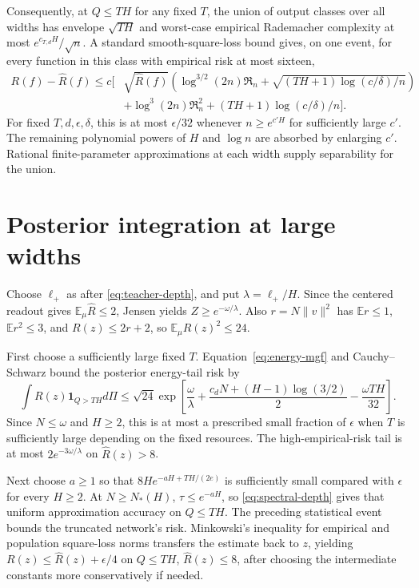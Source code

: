 \documentclass[11pt]{article}
\newcommand{\E}{\mathbb E}\newcommand{\R}{\mathbb R}\newcommand{\KL}{\operatorname{KL}}\newcommand{\op}{\mathrm{op}}
\begin{document}
Consequently, at $Q\le TH$ for any fixed $T$, the union of output classes over all widths has envelope $\sqrt{TH}$ and worst-case empirical Rademacher complexity at most $e^{c_{T,d}H}/\sqrt n$. A standard smooth-square-loss bound \cite{sst} gives, on one event, for every function in this class with empirical risk at most sixteen,
\[
 \begin{aligned}
 R(f)-\widehat R(f)\le c\bigg[&
 \sqrt{\widehat R(f)}\left(\log^{3/2}(2n)\mathfrak R_n+
       \sqrt{(TH+1)\log(c/\delta)/n}\right)\\
 &+\log^3(2n)\mathfrak R_n^2+(TH+1)\log(c/\delta)/n\bigg].
 \end{aligned}
\]
For fixed $T,d,\epsilon,\delta$, this is at most $\epsilon/32$ whenever $n\ge e^{c'H}$ for sufficiently large $c'$. The remaining polynomial powers of $H$ and $\log n$ are absorbed by enlarging $c'$. Rational finite-parameter approximations at each width supply separability for the union.

\section{Posterior integration at large widths}
Choose $\ell_+$ as after \eqref{eq:teacher-depth}, and put $\lambda=\ell_+/H$. Since the centered readout gives $\E_\mu\widehat R\le2$, Jensen yields $Z\ge e^{-\omega/\lambda}$. Also $r=N\|v\|^2$ has $\E r\le1$, $\E r^2\le3$, and $R(z)\le2r+2$, so $\E_\mu R(z)^2\le24$.

First choose a sufficiently large fixed $T$. Equation~\eqref{eq:energy-mgf} and Cauchy--Schwarz bound the posterior energy-tail risk by
\[
 \int R(z)\mathbf1_{Q>TH}d\Pi
 \le\sqrt{24}\exp\left[\frac\omega\lambda+
       \frac{c_dN+(H-1)\log(3/2)}2-\frac{\omega TH}{32}\right].
\]
Since $N\le\omega$ and $H\ge2$, this is at most a prescribed small fraction of $\epsilon$ when $T$ is sufficiently large depending on the fixed resources. The high-empirical-risk tail is at most
$2e^{-3\omega/\lambda}$ on $\widehat R(z)>8$.

Next choose $a\ge1$ so that $8H e^{-aH+TH/(2e)}$ is sufficiently small compared with $\epsilon$ for every $H\ge2$. At $N\ge N_*(H)$, $\tau\le e^{-aH}$, so \eqref{eq:spectral-depth} gives that uniform approximation accuracy on $Q\le TH$. The preceding statistical event bounds the truncated network's risk. Minkowski's inequality for empirical and population square-loss norms transfers the estimate back to $z$, yielding
$R(z)\le\widehat R(z)+\epsilon/4$ on $Q\le TH$, $\widehat R(z)\le8$, after choosing the intermediate constants more conservatively if needed.
\end{document}
